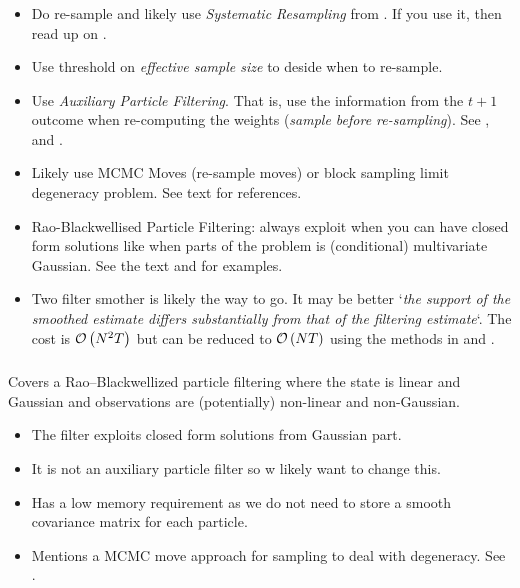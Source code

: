 \subsubsection*{\cite{doucet09}}
\begin{itemize}
	\item Do re-sample and likely use \emph{Systematic Resampling} from \cite{kitagawa96}. If you use it, then read up on \cite{douc05}.
	\item Use threshold on \emph{effective sample size} to deside when to re-sample.
	\item Use \emph{Auxiliary Particle Filtering}. That is, use the information from the $t + 1$ outcome when re-computing the weights (\textit{sample before re-sampling}). See \cite{carpenter99}, \cite{pitt01} and \cite{pitt99}.
	\item Likely use MCMC Moves (re-sample moves) or block sampling limit degeneracy problem. See text for references.
	\item Rao-Blackwellised Particle Filtering: always exploit when you can have closed form solutions like when parts of the problem is (conditional) multivariate Gaussian. See the text and \cite{andrieu02} for examples. 
	\item Two filter smother is likely the way to go. It may be better `\textit{the support of the smoothed estimate differs substantially from that of the filtering estimate}`. The cost is $\mathcal{O}\left( N^2T\right)$ but can be reduced to $\mathcal{O}\left( NT\right)$ using the methods in \cite{fearnhead10} and \cite{briers05}.
\end{itemize}

\subsubsection*{\cite{andrieu02}}
Covers a Rao–Blackwellized particle filtering where the state is linear and Gaussian and observations are (potentially) non-linear and non-Gaussian. 

\begin{itemize}
	\item The filter exploits closed form solutions from Gaussian part.
	\item It is not an auxiliary particle filter so w likely want to change this.
	\item Has a low memory requirement as we do not need to store a smooth covariance matrix for each particle.
	\item Mentions a MCMC move approach for sampling to deal with degeneracy. See \cite{de97}.
\end{itemize}

